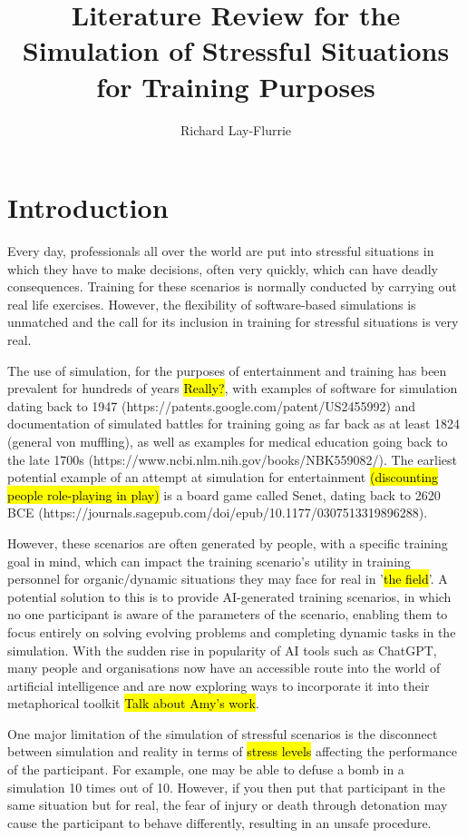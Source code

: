 \documentclass{article}
\title{Literature Review for the Simulation of Stressful Situations for Training Purposes}
\author{Richard Lay-Flurrie}
\begin{document}
\maketitle

\tableofcontents


\section{Introduction}

Every day, professionals all over the world are put into stressful situations in which they have to make decisions, often very quickly, which can have deadly consequences. Training for these scenarios is normally conducted by carrying out real life exercises. However, the flexibility of software-based simulations is unmatched and the call for its inclusion in training for stressful situations is very real.



The use of simulation, for the purposes of entertainment and training has been prevalent for hundreds of years \hl{Really?}, with examples of software for simulation dating back to 1947 (https://patents.google.com/patent/US2455992) and documentation of simulated battles for training going as far back as at least 1824 (general von muffling), as well as examples for medical education going back to the late 1700s (https://www.ncbi.nlm.nih.gov/books/NBK559082/). The earliest potential example of an attempt at simulation for entertainment \hl{(discounting people role-playing in play)} is a board game called Senet, dating back to 2620 BCE (https://journals.sagepub.com/doi/epub/10.1177/0307513319896288).


However, these scenarios are often generated by people, with a specific training goal in mind, which can impact the training scenario's utility in training personnel for organic/dynamic situations they may face for real in '\hl{the field}'. A potential solution to this is to provide AI-generated training scenarios, in which no one participant is aware of the parameters of the scenario, enabling them to focus entirely on solving evolving problems and completing dynamic tasks in the simulation. With the sudden rise in popularity of AI tools such as ChatGPT, many people and organisations now have an accessible route into the world of artificial intelligence and are now exploring ways to incorporate it into their metaphorical toolkit \hl{Talk about Amy's work}. 

One major limitation of the simulation of stressful scenarios is the disconnect between simulation and reality in terms of \hl{stress levels} affecting the performance of the participant. For example, one may be able to defuse a bomb in a simulation 10 times out of 10. However, if you then put that participant in the same situation but for real, the fear of injury or death through detonation may cause the participant to behave differently, resulting in an unsafe procedure.
\end{document}
